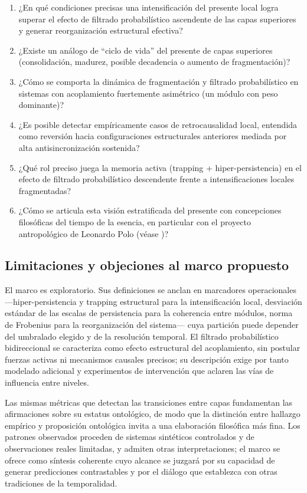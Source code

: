 \begin{enumerate}
    \item ¿En qué condiciones precisas una intensificación del presente local logra superar el efecto de filtrado probabilístico ascendente de las capas superiores y generar reorganización estructural efectiva?
    
    \item ¿Existe un análogo de ``ciclo de vida'' del presente de capas superiores (consolidación, madurez, posible decadencia o aumento de fragmentación)?
    
    \item ¿Cómo se comporta la dinámica de fragmentación y filtrado probabilístico en sistemas con acoplamiento fuertemente asimétrico (un módulo con peso dominante)?
    
    \item ¿Es posible detectar empíricamente casos de retrocausalidad local, entendida como reversión hacia configuraciones estructurales anteriores mediada por alta antisincronización sostenida?
    
    \item ¿Qué rol preciso juega la memoria activa (trapping + hiper-persistencia) en el efecto de filtrado probabilístico descendente frente a intensificaciones locales fragmentadas?
    
    \item ¿Cómo se articula esta visión estratificada del presente con concepciones filosóficas del tiempo de la esencia, en particular con el proyecto antropológico de Leonardo Polo (véase \citep{polo_antropologia_trascendental,padilla_polo_dialogue_2026})?
\end{enumerate}

\subsection{Limitaciones y objeciones al marco propuesto}

El marco es exploratorio. Sus definiciones se anclan en marcadores operacionales —hiper-persistencia y trapping estructural para la intensificación local, desviación estándar de las escalas de persistencia para la coherencia entre módulos, norma de Frobenius para la reorganización del sistema— cuya partición puede depender del umbralado elegido y de la resolución temporal. El filtrado probabilístico bidireccional se caracteriza como efecto estructural del acoplamiento, sin postular fuerzas activas ni mecanismos causales precisos; su descripción exige por tanto modelado adicional y experimentos de intervención que aclaren las vías de influencia entre niveles.

Las mismas métricas que detectan las transiciones entre capas fundamentan las afirmaciones sobre su estatus ontológico, de modo que la distinción entre hallazgo empírico y proposición ontológica invita a una elaboración filosófica más fina. Los patrones observados proceden de sistemas sintéticos controlados y de observaciones reales limitadas, y admiten otras interpretaciones; el marco se ofrece como síntesis coherente cuyo alcance se juzgará por su capacidad de generar predicciones contrastables y por el diálogo que establezca con otras tradiciones de la temporalidad.